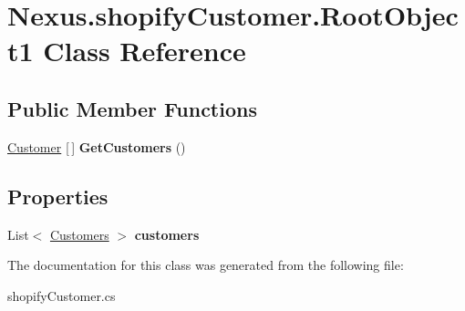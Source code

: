 \hypertarget{class_nexus_1_1shopify_customer_1_1_root_object1}{}\section{Nexus.\+shopify\+Customer.\+Root\+Object1 Class Reference}
\label{class_nexus_1_1shopify_customer_1_1_root_object1}
\subsection*{Public Member Functions}
\begin{DoxyCompactItemize}
\item 
\mbox{\label{class_nexus_1_1shopify_customer_1_1_root_object1_ae23b146ec4f47871f9f193f1697d22dd}} 
\mbox{\hyperlink{class_nexus_1_1_customer}{Customer}} \mbox{[}$\,$\mbox{]} {\bfseries Get\+Customers} ()
\end{DoxyCompactItemize}
\subsection*{Properties}
\begin{DoxyCompactItemize}
\item 
\mbox{\label{class_nexus_1_1shopify_customer_1_1_root_object1_ad5cfbf45df0ed65b24be3a3f18e96cc6}} 
List$<$ \mbox{\hyperlink{class_nexus_1_1shopify_customer_1_1_customers}{Customers}} $>$ {\bfseries customers}
\end{DoxyCompactItemize}


The documentation for this class was generated from the following file\+:\begin{DoxyCompactItemize}
\item 
shopify\+Customer.\+cs\end{DoxyCompactItemize}
